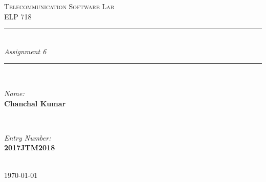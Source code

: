 \documentclass[12pt]{article}
\begin{document}
\begin{titlepage}

\newcommand{\HRule}{\rule{\linewidth}{0.6mm}} %

\center %
 

\textsc{\huge Telecommunication Software Lab}\\[1.5cm] %
\textsc{\Large ELP 718}\\[0.5cm] %

\HRule \\[0.4cm]
{ \large \textit {Assignment 6}}\\[0.4cm] %
\HRule \\[1.5cm]
 

\begin{minipage}{0.4\textwidth}
\begin{flushleft} \Large
\emph{Name:}\\
\textbf{Chanchal Kumar}%
\end{flushleft}
\end{minipage}
~
\begin{minipage}{0.4\textwidth}
\begin{flushright} \Large
\emph{Entry Number:} \\
\textbf{2017JTM2018} %
\end{flushright}
\end{minipage}\\[2cm]



{\large \today}\\[4cm] %


\end{titlepage}
\end{document}
